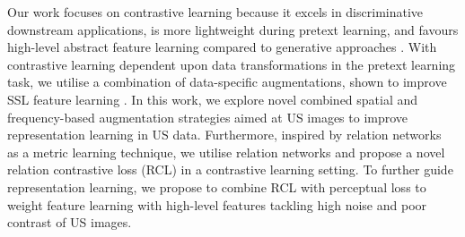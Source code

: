 

Our work focuses on contrastive learning because it excels in discriminative downstream applications, is more lightweight during pretext learning, and favours high-level abstract feature learning compared to generative approaches \cite{liu_self-supervised_2023}. With contrastive learning dependent upon data transformations in the pretext learning task, we utilise a combination of data-specific augmentations, shown to improve SSL feature learning \cite{chen_simple_2020}. In this work, we explore novel combined spatial and frequency-based augmentation strategies aimed at US images to improve representation learning in US data. Furthermore, inspired by relation networks~\cite{f_sung_learning_2018} as a metric learning technique, we utilise relation networks and propose a novel relation contrastive loss (RCL) in a contrastive learning setting. To further guide representation learning, 
we propose to combine RCL with perceptual loss to weight feature learning with high-level features tackling high noise and poor contrast of US images. 
%
%
%

